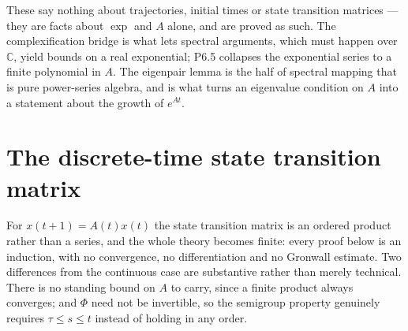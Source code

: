 These say nothing about trajectories, initial times or state transition matrices — they are
facts about $\exp$ and $A$ alone, and are proved as such. The complexification bridge is what
lets spectral arguments, which must happen over $\mathbb{C}$, yield bounds on a real
exponential; P6.5 collapses the exponential series to a finite polynomial in $A$. The
eigenpair lemma is the half of spectral mapping that is pure power-series algebra, and is what
turns an eigenvalue condition on $A$ into a statement about the growth of $e^{At}$.










\section{The discrete-time state transition matrix}

For $x(t+1) = A(t)x(t)$ the state transition matrix is an ordered product rather than a series,
and the whole theory becomes finite: every proof below is an induction, with no convergence,
no differentiation and no Gronwall estimate. Two differences from the continuous case are
substantive rather than merely technical. There is no standing bound on $A$ to carry, since a
finite product always converges; and $\Phi$ need not be invertible, so the semigroup property
genuinely requires $\tau \le s \le t$ instead of holding in any order.






